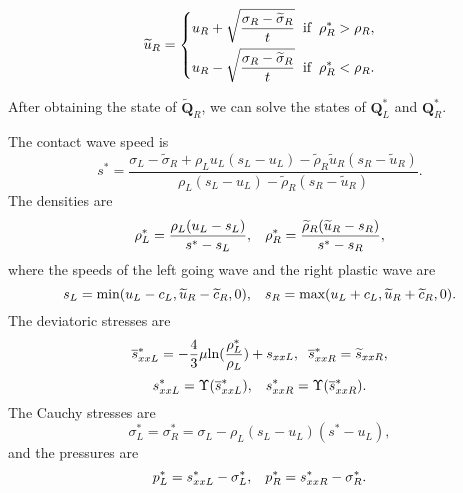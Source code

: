 \documentclass[review]{elsarticle}
\begin{document}
\begin{equation}
  \widetilde{u}_R= \left\{
  \begin{aligned}
    u_R+\sqrt{\frac{\sigma_R-\widetilde{\sigma}_R}{t}} \hspace{0.2cm} \text{if} \hspace{0.2cm} \rho_R^* >\rho_R,\\
    u_R-\sqrt{\frac{\sigma_R-\widetilde{\sigma}_R}{t}} \hspace{0.2cm} \text{if} \hspace{0.2cm} \rho_R^* <\rho_R.\\
\end{aligned} \right.
\end{equation}

After obtaining the state of $\widetilde{\mathbf{Q}}_R$, we can solve the states of $\mathbf{Q}_L^*$ and  $\mathbf{Q}_R^*$.

The contact wave speed is
\begin{equation}
  s^* = \frac{\sigma_L-\widetilde{\sigma}_R+\rho_L u_L(s_L-u_L)-\widetilde{\rho}_R \widetilde{u}_R(s_R-\widetilde{u}_R)}{\rho_L(s_L-u_L)-\widetilde{\rho}_R(s_R-\widetilde{u}_R)}.
\end{equation}
The densities are
\begin{equation}\label{eq:rhoLs}
  \rho_L^* = \frac{\rho_L(u_L-s_L)}{s^*-s_L}, \hspace{0.3cm}  \rho_R^* = \frac{\widetilde{\rho}_R(\widetilde{u}_R-s_R)}{s^*-s_R},
\end{equation}
where the  speeds of the left going wave and the right plastic wave are
    \begin{equation}
      s_L = \text{min} (u_L-c_L, \widetilde{u}_R-\widetilde{c}_R,0), \hspace{0.3cm} s_R = \text{max}(u_L+c_L, \widetilde{u}_R+\widetilde{c}_R,0).
    \end{equation}
    The deviatoric stresses are
\begin{equation}
  \overline{s}_{xxL}^*=-\frac{4}{3}\mu\text{ln}(\frac{\rho_L^*}{\rho_L})+s_{xxL},\hspace{0.2cm}  \overline{s}_{xxR}^*=\widetilde{s}_{xxR},
\end{equation}
\begin{equation}
  s_{xxL}^* = \Upsilon(\overline{s}_{xxL}^*), \hspace{0.3cm}  s_{xxR}^* = \Upsilon(\overline{s}_{xxR}^*).
\end{equation}
The Cauchy stresses are
\begin{equation}
  \sigma_L^*=\sigma_R^*=\sigma_L -\rho_L (s_L-u_L)(s^*-u_L),
\end{equation}
and the pressures are
\begin{equation}
  p_L^* = s_{xxL}^* - \sigma_L^*, \hspace{0.3cm}   p_R^* = s_{xxR}^* - \sigma_R^*.
\end{equation}
\end{document}
